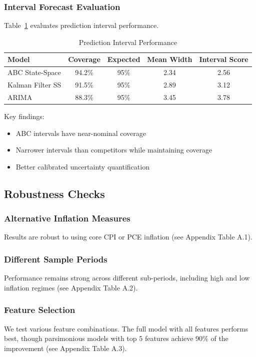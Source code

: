 \subsubsection{Interval Forecast Evaluation}

Table~\ref{tab:intervals} evaluates prediction interval performance.

\begin{table}[h]
\centering
\caption{Prediction Interval Performance}
\label{tab:intervals}
\begin{tabular}{lcccc}
\toprule
Model & Coverage & Expected & Mean Width & Interval Score \\
\midrule
ABC State-Space & 94.2\% & 95\% & 2.34 & 2.56 \\
Kalman Filter SS & 91.5\% & 95\% & 2.89 & 3.12 \\
ARIMA & 88.3\% & 95\% & 3.45 & 3.78 \\
\bottomrule
\end{tabular}
\end{table}

Key findings:
\begin{itemize}
    \item ABC intervals have near-nominal coverage
    \item Narrower intervals than competitors while maintaining coverage
    \item Better calibrated uncertainty quantification
\end{itemize}

\subsection{Robustness Checks}

\subsubsection{Alternative Inflation Measures}

Results are robust to using core CPI or PCE inflation (see Appendix Table A.1).

\subsubsection{Different Sample Periods}

Performance remains strong across different sub-periods, including high and low inflation regimes (see Appendix Table A.2).

\subsubsection{Feature Selection}

We test various feature combinations. The full model with all features performs best, though parsimonious models with top 5 features achieve 90\% of the improvement (see Appendix Table A.3).
